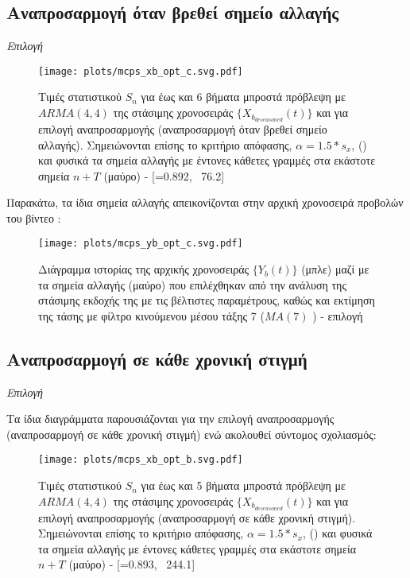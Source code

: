 \subsection{Αναπροσαρμογή όταν βρεθεί σημείο αλλαγής}

\textit{Επιλογή }

\begin{figure}[H]
    \begin{center}
        \texttt{[image: plots/mcps\_xb\_opt\_c.svg.pdf]}
        \caption{Τιμές στατιστικού $S_n$ για έως και 6 βήματα μπροστά πρόβλεψη με $ARMA(4,4)$ της στάσιμης χρονοσειράς $\{X_{b_{deseasoned}}(t)\}$ και για επιλογή αναπροσαρμογής  (αναπροσαρμογή όταν βρεθεί σημείο αλλαγής). Σημειώνονται επίσης το κριτήριο απόφασης, $\alpha=1.5*s_x$, () και φυσικά τα σημεία αλλαγής με έντονες κάθετες γραμμές στα εκάστοτε σημεία $n+T$ (μαύρο) - [=0.892, \ 76.2]}
        \label{fig:mcps_xb_opt_c}
    \end{center}
\end{figure}

Παρακάτω, τα ίδια σημεία αλλαγής απεικονίζονται στην αρχική χρονοσειρά προβολών του βίντεο :

\begin{figure}[H]
    \begin{center}
        \texttt{[image: plots/mcps\_yb\_opt\_c.svg.pdf]}
        \caption{Διάγραμμα ιστορίας της αρχικής χρονοσειράς $\{Y_b(t)\}$ (μπλε) μαζί με τα σημεία αλλαγής (μαύρο) που επιλέχθηκαν από την ανάλυση της στάσιμης εκδοχής της με τις βέλτιστες παραμέτρους, καθώς και εκτίμηση της τάσης με φίλτρο κινούμενου μέσου τάξης 7 ($MA(7)$ ) - επιλογή }
        \label{fig:mcps_yb_opt_c}
    \end{center}
\end{figure}


\subsection{Αναπροσαρμογή σε κάθε χρονική στιγμή}

\textit{Επιλογή }

\par Τα ίδια διαγράμματα παρουσιάζονται για την επιλογή αναπροσαρμογής  (αναπροσαρμογή σε κάθε χρονική στιγμή) ενώ ακολουθεί σύντομος σχολιασμός:

\begin{figure}[H]
    \begin{center}
        \texttt{[image: plots/mcps\_xb\_opt\_b.svg.pdf]}
        \caption{Τιμές στατιστικού $S_n$ για έως και 5 βήματα μπροστά πρόβλεψη με $ARMA(4,4)$ της στάσιμης χρονοσειράς $\{X_{b_{deseasoned}}(t)\}$ και για επιλογή αναπροσαρμογής  (αναπροσαρμογή σε κάθε χρονική στιγμή). Σημειώνονται επίσης το κριτήριο απόφασης, $\alpha=1.5*s_x$, () και φυσικά τα σημεία αλλαγής με έντονες κάθετες γραμμές στα εκάστοτε σημεία $n+T$ (μαύρο) - [=0.893, \ 244.1]}
        \label{fig:mcps_xb_opt_b}
    \end{center}
\end{figure}

